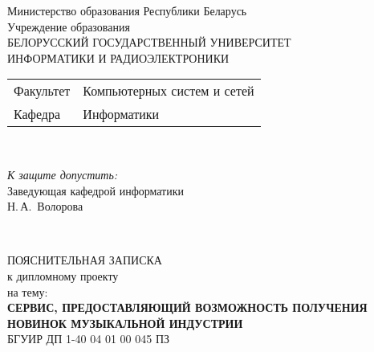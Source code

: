 \begin{titlepage}
  \begin{center}
    Министерство образования Республики Беларусь\\[1em]
    Учреждение образования\\
    БЕЛОРУССКИЙ ГОСУДАРСТВЕННЫЙ УНИВЕРСИТЕТ \\
    ИНФОРМАТИКИ И РАДИОЭЛЕКТРОНИКИ\\[1em]

    \begin{minipage}{\textwidth}
      \begin{flushleft}
        \begin{tabular}{ l l }
          Факультет & Компьютерных систем и сетей\\
          Кафедра   & Информатики
        \end{tabular}
      \end{flushleft}
    \end{minipage}\\[1em]

    \begin{flushright}
      \begin{minipage}{0.4\textwidth}
        \textit{К защите допустить:}\\[0.8em]
        Заведующая кафедрой информатики\\[0.45em]
        \underline{\hspace*{2.8cm}} Н.\,А.~Волорова
      \end{minipage}\\[2.2em]
    \end{flushright}

    {ПОЯСНИТЕЛЬНАЯ ЗАПИСКА}\\
    {к дипломному проекту}\\
    {на тему:}\\[1em]
    \textbf{\large СЕРВИС, ПРЕДОСТАВЛЯЮЩИЙ ВОЗМОЖНОСТЬ ПОЛУЧЕНИЯ НОВИНОК МУЗЫКАЛЬНОЙ ИНДУСТРИИ}\\[1em]


    {БГУИР ДП 1-40 04 01 00 045 ПЗ}\\[2em]


\end{center}
\end{titlepage}

